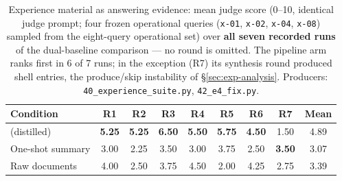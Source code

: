 \begin{table}[t]
\centering\footnotesize
\setlength{\tabcolsep}{2.6pt}
\caption{Experience material as answering evidence: mean judge score (0--10,
identical judge prompt; four frozen operational queries (\texttt{x-01},
\texttt{x-02}, \texttt{x-04}, \texttt{x-08}) sampled from the eight-query
operational set) over \textbf{all
seven recorded runs} of the dual-baseline comparison --- no round is omitted.
The pipeline arm ranks first in 6 of 7 runs;
in the exception (R7) its synthesis round produced shell entries, the
produce/skip instability of \S\ref{sec:exp-analysis}. Producers:
\texttt{40\_experience\_suite.py}, \texttt{42\_e4\_fix.py}.}
\label{tab:e4}
\begin{tabular}{@{}lccccccc|c@{}}
\toprule
Condition & R1 & R2 & R3 & R4 & R5 & R6 & R7 & Mean \\
\midrule
\sys{} (distilled) & \textbf{5.25} & \textbf{5.25} & \textbf{6.50} & \textbf{5.50} & \textbf{5.75} & \textbf{4.50} & 1.50 & 4.89 \\
One-shot summary & 3.00 & 2.25 & 3.50 & 3.00 & 3.75 & 2.50 & \textbf{3.50} & 3.07 \\
Raw documents & 4.00 & 2.50 & 3.75 & 4.50 & 2.00 & 4.25 & 2.75 & 3.39 \\
\bottomrule
\end{tabular}
\end{table}
